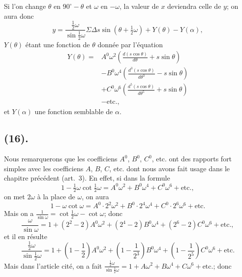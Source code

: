 \documentclass{article}
\begin{document}

Si l'on change $\theta$ en $90^{\circ}-\theta$ et $\omega$ en $-\omega$, la valeur de $x$ deviendra celle de $y$; on aura donc
\[ y=\frac{\frac{1}{2}\omega}{\sin\frac{1}{2}\omega}\Sigma\Delta s\sin(\theta+\tfrac{1}{2}\omega)+Y(\theta)-Y(\alpha), \]
$Y(\theta)$ étant une fonction de $\theta$ donnée par l'équation
\[ \begin{aligned} Y(\theta)={}&A^{0}\omega^{2}\left(\frac{d(s\cos\theta)}{d\theta}+s\sin\theta\right)\\ &-B^{0}\omega^{4}\left(\frac{d^{3}(s\cos\theta)}{d\theta^{3}}-s\sin\theta\right)\\ &+C^{0}\omega^{6}\left(\frac{d^{5}(s\cos\theta)}{d\theta^{5}}+s\sin\theta\right)\\ &-\text{etc.}, \end{aligned} \]
et $Y(\alpha)$ une fonction semblable de $\alpha$.

\subsection*{(16).}

Nous remarquerons que les coefficiens $A^{0}$, $B^{0}$, $C^{0}$, etc. ont des rapports fort simples avec les coefficiens $A$, $B$, $C$, etc. dont nous avons fait usage dans le chapitre précédent (art.~3). En effet, si dans la formule
\[ 1-\tfrac{1}{2}\omega\cot\tfrac{1}{2}\omega=A^{0}\omega^{2}+B^{0}\omega^{4}+C^{0}\omega^{6}+\text{etc.}, \]
on met $2\omega$ à la place de $\omega$, on aura
\[ 1-\omega\cot\omega=A^{0}\cdot2^{2}\omega^{2}+B^{0}\cdot2^{4}\omega^{4}+C^{0}\cdot2^{6}\omega^{6}+\text{etc.} \]
Mais on a $\frac{1}{\sin\omega}=\cot\frac{1}{2}\omega-\cot\omega$; donc
\[ \frac{\omega}{\sin\omega}=1+(2^{2}-2)A^{0}\omega^{2}+(2^{4}-2)B^{0}\omega^{4}+(2^{6}-2)C^{0}\omega^{6}+\text{etc.}, \]
et il en résulte
\[ \frac{\frac{1}{2}\omega}{\sin\frac{1}{2}\omega}=1+\left(1-\frac{1}{2}\right)A^{0}\omega^{2}+\left(1-\frac{1}{2^{3}}\right)B^{0}\omega^{4}+\left(1-\frac{1}{2^{5}}\right)C^{0}\omega^{6}+\text{etc.} \]
Mais dans l'article cité, on a fait $\frac{\frac{1}{2}\omega}{\sin\frac{1}{2}\omega}=1+A\omega^{2}+B\omega^{4}+C\omega^{6}+\text{etc.}$; donc
\end{document}
